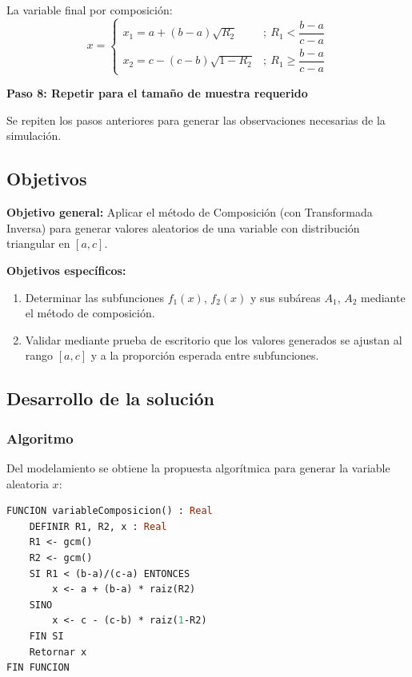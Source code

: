 La variable final por composición:
\[
x=\begin{cases}
x_1 = a+(b-a)\sqrt{R_2}   & ;\ R_1 < \dfrac{b-a}{c-a} \\[8pt]
x_2 = c-(c-b)\sqrt{1-R_2} & ;\ R_1 \geq \dfrac{b-a}{c-a}
\end{cases}
\]

\textbf{Paso 8: Repetir para el tamaño de muestra requerido}

Se repiten los pasos anteriores para generar las observaciones necesarias de la simulación.

\subsection{Objetivos}

\textbf{Objetivo general:} Aplicar el método de Composición (con Transformada Inversa) para generar valores aleatorios de una variable con distribución triangular en $[a,c]$.

\textbf{Objetivos específicos:}
\begin{enumerate}
    \item Determinar las subfunciones $f_1(x)$, $f_2(x)$ y sus subáreas $A_1$, $A_2$ mediante el método de composición.
    \item Validar mediante prueba de escritorio que los valores generados se ajustan al rango $[a,c]$ y a la proporción esperada entre subfunciones.
\end{enumerate}

\subsection{Desarrollo de la solución}

\subsubsection{Algoritmo}

Del modelamiento se obtiene la propuesta algorítmica para generar la variable aleatoria $x$:

\begin{lstlisting}[caption={Pseudocódigo — Método de Composición}, language=Pascal]
FUNCION variableComposicion() : Real
    DEFINIR R1, R2, x : Real
    R1 <- gcm()
    R2 <- gcm()
    SI R1 < (b-a)/(c-a) ENTONCES
        x <- a + (b-a) * raiz(R2)
    SINO
        x <- c - (c-b) * raiz(1-R2)
    FIN SI
    Retornar x
FIN FUNCION
\end{lstlisting}


